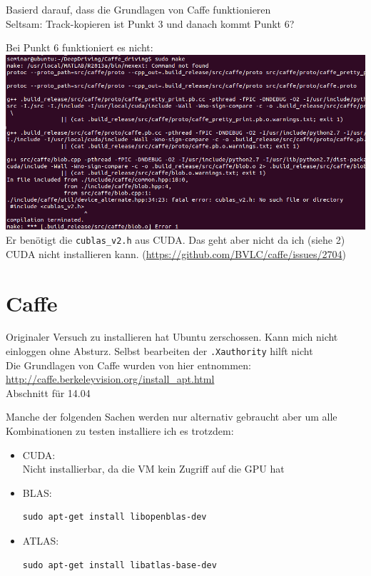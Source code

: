 \documentclass[11pt]{article}
\begin{document}
Basierd darauf, dass die Grundlagen von Caffe funktionieren\\

Seltsam: Track-kopieren ist Punkt 3 und danach kommt Punkt 6?


Bei Punkt 6 funktioniert es nicht:\\
\includegraphics[scale=0.5]{caffe_driving-error1.PNG}\\
Er benötigt die \texttt{cublas\_v2.h} aus CUDA. Das geht aber nicht da ich (siehe 2) CUDA nicht installieren kann.
(\url{https://github.com/BVLC/caffe/issues/2704})

\section{Caffe} \label{Caffe}
	Originaler Versuch zu installieren hat Ubuntu zerschossen. Kann mich nicht einloggen ohne Absturz. Selbst bearbeiten der \texttt{.Xauthority} hilft nicht\\
	
	Die Grundlagen von Caffe wurden von hier entnommen:\\
	\url{http://caffe.berkeleyvision.org/install_apt.html}\\
	Abschnitt für 14.04
	
	Manche der folgenden Sachen werden nur alternativ gebraucht aber um alle Kombinationen zu testen installiere ich es trotzdem:
	\begin{itemize}
		\item CUDA:\\
			Nicht installierbar, da die VM kein Zugriff auf die GPU hat
		\item BLAS:
		\begin{lstlisting}
sudo apt-get install libopenblas-dev
		\end{lstlisting}
		\item ATLAS:
			\begin{lstlisting}
sudo apt-get install libatlas-base-dev
			\end{lstlisting}
	\end{itemize}
	
\end{document}
